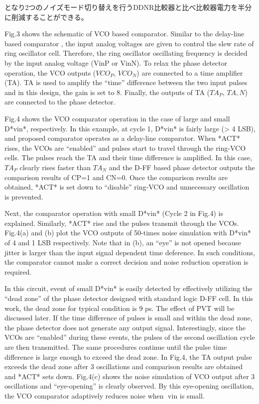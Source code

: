 \documentclass[letterpaper, 10 pt, conference]{ieeeconf}  %
\begin{document}
となり2つのノイズモード切り替えを行うDDNR比較器と比べ比較器電力を半分に削減することができる。

Fig.3 shows the schematic of VCO based comparator. Similar to the delay-line based comparator \cite{agnes20089}, the input analog voltages are given to control the slew rate of ring oscillator cell. Therefore, the ring oscillator oscillating frequency is decided by the input analog voltage (VinP or VinN). To relax the phase detector operation, the VCO outputs ($VCO_P$, $VCO_N$) are connected to a time amplifier (TA). TA \cite{lee20089} is used to amplify the “time” difference between the two input pulses and in this design, the gain is set to 8. Finally, the outputs of TA ($TA_P$, $TA,N$) are connected to the phase detector.

Fig.4 shows the VCO comparator operation in the case of large and small D*vin*, respectively. In this example, at cycle 1, D*vin* is fairly large (> 4 LSB), and proposed comparator operates as a delay-line comparator. When *ACT* rises, the VCOs are “enabled” and pulses start to travel through the ring-VCO cells. The pulses reach the TA and their time difference is amplified. In this case, $TA_P$ clearly rises faster than $TA_N$ and the D-FF based phase detector outputs the comparison results of CP=1 and CN=0. Once the comparison results are obtained, *ACT* is set down to “disable” ring-VCO and unnecessary oscillation is prevented.

Next, the comparator operation with small D*vin* (Cycle 2 in Fig.4) is explained. Similarly, *ACT* rise and the pulses transmit through the VCOs. Fig.4(a) and (b) plot the VCO outputs of 50-times noise simulation with D*vin* of 4 and 1 LSB respectively. Note that in (b), an “eye” is not opened because jitter is larger than the input signal dependent time deference. In such conditions, the comparator cannot make a correct decision and noise reduction operation is required.

In this circuit, event of small D*vin* is easily detected by effectively utilizing the “dead zone” of the phase detector designed with standard logic D-FF cell. In this work, the dead zone for typical condition is 9 ps. The effect of PVT will be discussed later. If the time difference of pulses is small and within the dead zone, the phase detector does not generate any output signal. Interestingly, since the VCOs are “enabled” during these events, the pulses of the second oscillation cycle are then transmitted. The same procedures continue until the pulse time difference is large enough to exceed the dead zone. In Fig.4, the TA output pulse exceeds the dead zone after 3 oscillations and comparison results are obtained and *ACT* sets down. Fig.4(c) shows the noise simulation of VCO output after 3 oscillations and “eye-opening” is clearly observed. By this eye-opening oscillation, the VCO comparator adaptively reduces noise when vin is small.
\end{document}
